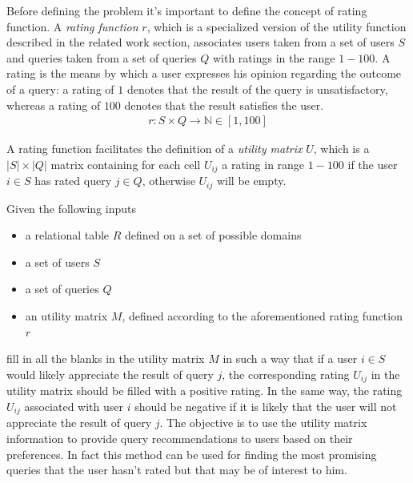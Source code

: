\begin{definition}
    Before defining the problem it's important to define the concept of rating function. A \emph{rating function} $r$, which is a specialized version of the utility function described in the related work section, associates users taken from a set of users $S$ and queries taken from a set of queries $Q$ with ratings in the range $1-100$. A rating is the means by which a user expresses his opinion regarding the outcome of a query: a rating of $1$ denotes that the result of the query is unsatisfactory, whereas a rating of $100$ denotes that the result satisfies the user. 
    \begin{equation}
    \begin{aligned}
    r \colon S \times Q \to \mathbb{N} \in [1,100]
    \end{aligned}
    \end{equation}
    
    A rating function facilitates the definition of a \emph{utility matrix} $U$, which is a $|S| \times |Q|$ matrix containing for each cell $U_{ij}$ a rating in range $1-100$ if the user $i \in S$ has rated query $j \in Q$, otherwise $U_{ij}$ will be empty. 
\end{definition}





\begin{definition}
    Given the following inputs
    \begin{itemize}
        \item a relational table $R$ defined on a set of possible domains
        \item a set of users $S$
        \item a set of queries $Q$
        \item an utility matrix $M$, defined according to the aforementioned rating function $r$
    \end{itemize}
    fill in all the blanks in the utility matrix $M$ in such a way that if a user $i \in S$ would likely appreciate the result of query $j$, the corresponding rating $U_{ij}$ in the utility matrix should be filled with a positive rating. In the same way, the rating $U_{ij}$ associated with user $i$ should be negative if it is likely that the user will not appreciate the result of query $j$. 
    The objective is to use the utility matrix information to provide query recommendations to users based on their preferences. In fact this method can be used for finding the most promising queries that the user hasn't rated but that may be of interest to him. 

\end{definition}



